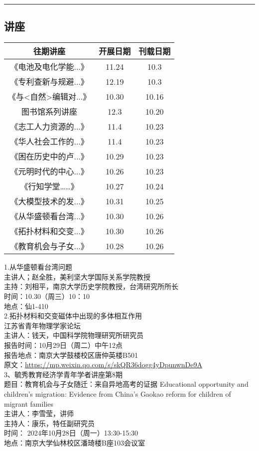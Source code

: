 \documentclass[letterpaper, 12pt]{article}
\begin{document}
\hrule
\pagebreak
\begin{multicols}{2}

\section{讲座}
\begin{tabular}{|c|c|c|}
    \hline
    往期讲座 & 开展日期 & 刊载日期\\
    \hline\hline
    《电池及电化学能...》 & 11.24 & 10.3\\
    《专利查新与规避...》 & 12.19 & 10.3\\
    《与<自然>编辑对...》 & 10.30 & 10.16\\
    图书馆系列讲座 & 12.3 & 10.20\\
    《志工人力资源的...》 & 11.4 & 10.23\\
    《华人社会工作的...》 & 11.4 & 10.23\\
    《困在历史中的卢...》 & 10.29 & 10.23\\
    《元明时代的中心...》 & 10.26 & 10.23\\
    《行知学堂……》 & 10.27 & 10.24\\
    《大模型技术的发...》 & 10.31 & 10.25\\
    《从华盛顿看台湾...》 & 10.30 & 10.26\\
    《拓扑材料和交变...》 & 10.30 & 10.26\\
    《教育机会与子女...》 & 10.28 & 10.26\\
    \hline
\end{tabular}

1.从华盛顿看台湾问题\\
主讲人；赵全胜，美利坚大学国际关系学院教授\\
主持：刘相平，南京大学历史学院教授，台湾研究所所长\\
时间：10.30（周三）10：10\\
地点：仙1-410\\

2.拓扑材料和交变磁体中出现的多体相互作用\\
江苏省青年物理学家论坛\\
主讲人：钱天，中国科学院物理研究所研究员\\
报告时间：10月29日（周二）中午12点\\
报告地点：南京大学鼓楼校区唐仲英楼B501\\
原文：\url{https://mp.weixin.qq.com/s/skQR36dogg4yDpunwnDe9A}\\

3、毓秀教育经济学青年学者讲座第8期\\
题目：教育机会与子女随迁：来自异地高考的证据 Educational opportunity and children's migration: Evidence from China's Gaokao reform for children of migrant families\\
主讲人：李雪莹，讲师\\
主持人：康乐，特任副研究员\\
时间： 2024年10月28日（周一）13:30-15:30\\
地点：南京大学仙林校区潘琦楼B座103会议室\\






\end{multicols}
\end{document}
